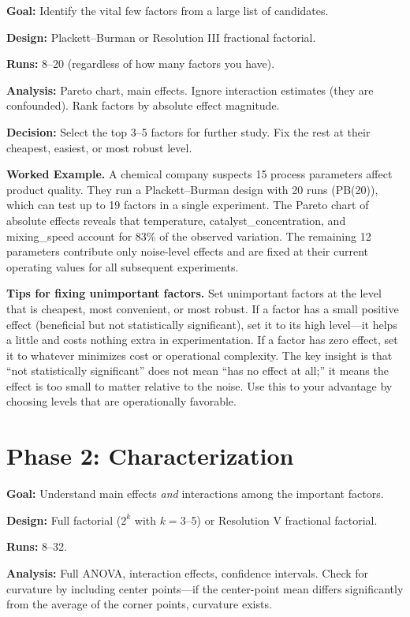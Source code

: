 \documentclass[11pt]{book}
\begin{document}
\textbf{Goal:} Identify the vital few factors from a large list of candidates.

\textbf{Design:} Plackett--Burman or Resolution III fractional factorial.

\textbf{Runs:} 8--20 (regardless of how many factors you have).

\textbf{Analysis:} Pareto chart, main effects. Ignore interaction estimates (they
are confounded). Rank factors by absolute effect magnitude.

\textbf{Decision:} Select the top 3--5 factors for further study. Fix the rest
at their cheapest, easiest, or most robust level.

\medskip
\noindent\textbf{Worked Example.}
A chemical company suspects 15 process parameters affect product quality.
They run a Plackett--Burman design with 20 runs (PB(20)), which can test up
to 19 factors in a single experiment. The Pareto chart of absolute effects
reveals that temperature, catalyst\_concentration, and mixing\_speed account
for 83\% of the observed variation. The remaining 12 parameters contribute
only noise-level effects and are fixed at their current operating values for
all subsequent experiments.

\medskip
\noindent\textbf{Tips for fixing unimportant factors.}
Set unimportant factors at the level that is cheapest, most convenient, or
most robust. If a factor has a small positive effect (beneficial but not
statistically significant), set it to its high level---it helps a little and
costs nothing extra in experimentation. If a factor has zero effect, set it
to whatever minimizes cost or operational complexity. The key insight is that
``not statistically significant'' does not mean ``has no effect at all;''
it means the effect is too small to matter relative to the noise. Use this to
your advantage by choosing levels that are operationally favorable.

\section{Phase 2: Characterization}

\textbf{Goal:} Understand main effects \emph{and} interactions among the important
factors.

\textbf{Design:} Full factorial ($2^k$ with $k = 3$--5) or Resolution V
fractional factorial.

\textbf{Runs:} 8--32.

\textbf{Analysis:} Full ANOVA, interaction effects, confidence intervals. Check
for curvature by including center points---if the center-point mean differs
significantly from the average of the corner points, curvature exists.
\end{document}

